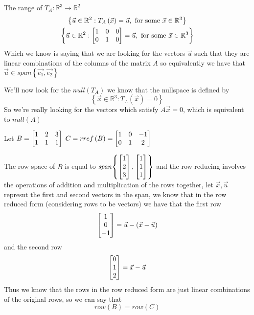 \documentclass[11pt]{book}
\begin{document}
\begin{eg}
    The range of $T_{A} : \mathbb{R}^3 \to \mathbb{R}^2 $ 
    \begin{gather*}
        \left\{ \vec{u} \in \mathbb{R}^2: T_{A}\left(\vec{x}\right) = \vec{u}, \text{ for some } \vec{x} \in \mathbb{R}^3 \right\} \\
        \left\{ \vec{u} \in \mathbb{R}^2: \begin{bmatrix} 1 & 0 & 0 \\ 0 & 1 & 0 \end{bmatrix} = \vec{u}, \text{ for some } \vec{x} \in \mathbb{R}^3 \right\}
    \end{gather*}
    Which we know is saying that we are looking for the vectors $\vec{u}$  such that they are linear combinations of the columns of the matrix $A$ so equivalently we have that $\vec{u} \in \mathit{span} {\left\{ \vec{e_1}, \vec{e_2} \right\}} $ 

    We'll now look for the $\mathit{null} {\left( T_{A} \right)} $ we know that the nullspace is defined by 
    \begin{equation*}
        \left\{ \vec{x} \in \mathbb{R}^3 : T_{A}\left(\vec{x}\right) = 0 \right\}
    \end{equation*}
    So we're really looking for the vectors which satisfy $A \vec{x} = 0$, which is equivalent to $\mathit{null} {\left( A \right)} $ 
\end{eg}

Let $B = \begin{bmatrix} 1 & 2 & 3 \\ 1 & 1 & 1 \end{bmatrix}$ $C = rref\left(B\right) = \begin{bmatrix} 1 & 0 & -1 \\ 0 & 1 & 2 \end{bmatrix}$ 

\begin{eg}
    The row space of $B$ is equal to  $\mathit{span} {\left\{ \begin{bmatrix} 1 \\ 2 \\ 3 \end{bmatrix}, \begin{bmatrix} 1 \\ 1 \\ 1 \end{bmatrix} \right\}} $ and the row reducing involves the operations of addition and multiplication of the rows together, let $\vec{x}, \vec{u}$ represnt the first and second vectors in the span, we know that in the row reduced form (considering rows to be vectors) we have that the first row
    \begin{equation*}
        \begin{bmatrix} 1 \\ 0 \\ -1 \end{bmatrix} = \vec{u} - \left( \vec{x} - \vec{u} \right)
    \end{equation*}
    and the second row
    \begin{equation*}
        \begin{bmatrix} 0 \\ 1 \\ 2 \end{bmatrix} = \vec{x} - \vec{u}
    \end{equation*}
    Thus we know that the rows in the row reduced form are just linear combinations of the original rows, so we can say that
    \begin{equation*}
        row\left(B\right) = row\left(C\right)
    \end{equation*}
\end{eg}
\end{document}
